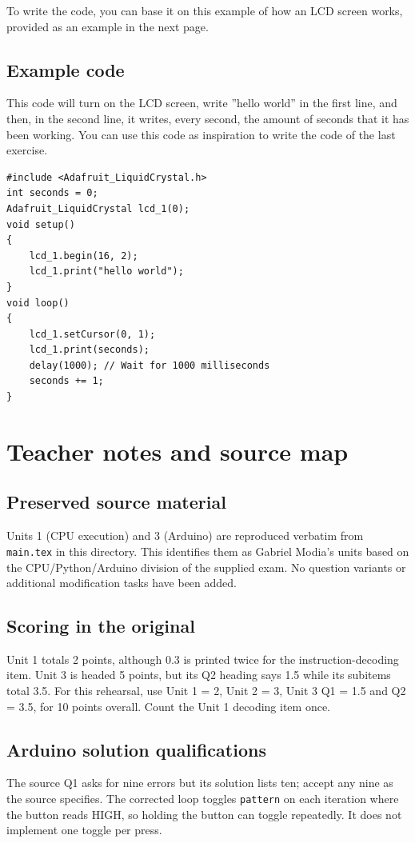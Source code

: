 \documentclass[10pt]{article}
\let\OldSection\section
\renewcommand{\section}{\clearpage\OldSection}
\begin{document}
To write the code, you can base it on this example of how an LCD screen works, provided as an
example in the next page.

\subsection{Example code}
This code will turn on the LCD screen, write ”hello world” in the first line, and then, in the
second line, it writes, every second, the amount of seconds that it has been working. You can
use this code as inspiration to write the code of the last exercise.

\begin{verbatim}
#include <Adafruit_LiquidCrystal.h>
int seconds = 0;
Adafruit_LiquidCrystal lcd_1(0);
void setup()
{
    lcd_1.begin(16, 2);
    lcd_1.print("hello world");
}
void loop()
{
    lcd_1.setCursor(0, 1);
    lcd_1.print(seconds);
    delay(1000); // Wait for 1000 milliseconds
    seconds += 1;
}    
\end{verbatim}

\section*{Teacher notes and source map}
\subsection*{Preserved source material}
Units 1 (CPU execution) and 3 (Arduino) are reproduced verbatim from \texttt{main.tex} in this directory. This identifies them as Gabriel Modia's units based on the CPU/Python/Arduino division of the supplied exam. No question variants or additional modification tasks have been added.

\subsection*{Scoring in the original}
Unit 1 totals 2 points, although 0.3 is printed twice for the instruction-decoding item. Unit 3 is headed 5 points, but its Q2 heading says 1.5 while its subitems total 3.5. For this rehearsal, use Unit 1 = 2, Unit 2 = 3, Unit 3 Q1 = 1.5 and Q2 = 3.5, for 10 points overall. Count the Unit 1 decoding item once.

\subsection*{Arduino solution qualifications}
The source Q1 asks for nine errors but its solution lists ten; accept any nine as the source specifies. The corrected loop toggles \texttt{pattern} on each iteration where the button reads HIGH, so holding the button can toggle repeatedly. It does not implement one toggle per press.
\end{document}
